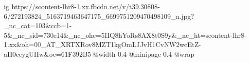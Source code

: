  
 
 
 
 

\ifcmt
  ig https://scontent-lhr8-1.xx.fbcdn.net/v/t39.30808-6/272193824_5163719463647175_6699751209470498109_n.jpg?_nc_cat=103&ccb=1-5&_nc_sid=730e14&_nc_ohc=5IIQ8hYoRs8AX8t0S9y&_nc_ht=scontent-lhr8-1.xx&oh=00_AT_XRTXRov8MZT1kgOmLJJvH1CvNW2wcEtZ-aH0ceygUHw&oe=61F392B5
  @width 0.4
  @minipage 0.4
  @wrap \parpic[r]
\fi
